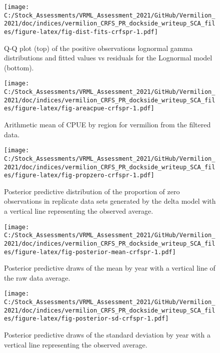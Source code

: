 \documentclass[11pt,
  english,
  a4paper,
]{article}
\begin{document}
\FloatBarrier

\FloatBarrier

\begin{figure}
\centering
\texttt{[image: C:/Stock\_Assessments/VRML\_Assessment\_2021/GitHub/Vermilion\_2021/doc/indices/vermilion\_CRFS\_PR\_dockside\_writeup\_SCA\_files/figure-latex/fig-dist-fits-crfspr-1.pdf]}
\caption{\label{fig:fig-dist-fits-crfspr}Q-Q plot (top) of the positive observations lognormal gamma distributions and fitted values vs residuals for the Lognormal model (bottom).}
\end{figure}

\begin{figure}
\centering
\texttt{[image: C:/Stock\_Assessments/VRML\_Assessment\_2021/GitHub/Vermilion\_2021/doc/indices/vermilion\_CRFS\_PR\_dockside\_writeup\_SCA\_files/figure-latex/fig-areacpue-crfspr-1.pdf]}
\caption{\label{fig:fig-areacpue-crfspr}Arithmetic mean of CPUE by region for vermilion from the filtered data.}
\end{figure}

\begin{figure}
\centering
\texttt{[image: C:/Stock\_Assessments/VRML\_Assessment\_2021/GitHub/Vermilion\_2021/doc/indices/vermilion\_CRFS\_PR\_dockside\_writeup\_SCA\_files/figure-latex/fig-propzero-crfspr-1.pdf]}
\caption{\label{fig:fig-propzero-crfspr}Posterior predictive distribution of the proportion of zero observations in replicate data sets generated by the delta model with a vertical line representing the observed average.}
\end{figure}

\begin{figure}
\centering
\texttt{[image: C:/Stock\_Assessments/VRML\_Assessment\_2021/GitHub/Vermilion\_2021/doc/indices/vermilion\_CRFS\_PR\_dockside\_writeup\_SCA\_files/figure-latex/fig-posterior-mean-crfspr-1.pdf]}
\caption{\label{fig:fig-posterior-mean-crfspr}Posterior predictive draws of the mean by year with a vertical line of the raw data average.}
\end{figure}

\begin{figure}
\centering
\texttt{[image: C:/Stock\_Assessments/VRML\_Assessment\_2021/GitHub/Vermilion\_2021/doc/indices/vermilion\_CRFS\_PR\_dockside\_writeup\_SCA\_files/figure-latex/fig-posterior-sd-crfspr-1.pdf]}
\caption{\label{fig:fig-posterior-sd-crfspr}Posterior predictive draws of the standard deviation by year with a vertical line representing the observed average.}
\end{figure}
\end{document}
